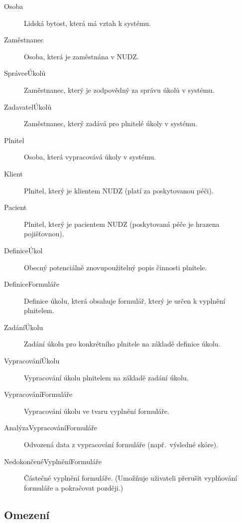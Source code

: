 \begin{description}
\item[Osoba]
  Lidská bytost, která má vztah k systému.

\item[Zaměstnanec]
  Osoba, která je zaměstnána v NUDZ\@.

\item[SprávceÚkolů]
  Zaměstnanec, který je zodpovědný za správu úkolů v systému.

\item[ZadavatelÚkolů]
  Zaměstnanec, který zadává pro plnitelé úkoly v systému.

\item[Plnitel]
  Osoba, která vypracovává úkoly v systému.

\item[Klient]
  Plnitel, který je klientem NUDZ (platí za poskytovanou péči).

\item[Pacient]
  Plnitel, který je pacientem NUDZ (poskytovaná péče je hrazena pojišťovnou).

\item[DefiniceÚkol]
  Obecný potenciálně znovupoužitelný popis činnosti plnitele.

\item[DefiniceFormuláře]
  Definice úkolu, která obsahuje formulář, který je určen k vyplnění plnitelem.

\item[ZadáníÚkolu]
  Zadání úkolu pro konkrétního plnitele na základě definice úkolu.

\item[VypracováníÚkolu]
  Vypracování úkolu plnitelem na základě zadání úkolu.

\item[VypracováníFormuláře]
  Vypracování úkolu ve tvaru vyplnění formuláře.

\item[AnalýzaVypracováníFormuláře]
Odvozená data z vypracování formuláře (např.\ výsledné skóre).

\item[NedokončenéVyplněníFormuláře]
Částečné vyplnění formuláře.
(Umožňuje uživateli přerušit vyplňování formuláře a pokračovat později.)

\end{description}

\subsection{Omezení}\label{subsec:omezeni}

